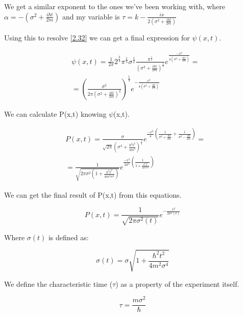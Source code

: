 We get a similar exponent to the ones we've been working with, where $\alpha = - (\sigma^2 + \frac{i\hbar t}{2m})$ and my variable is $\tau = k - \frac{ix}{2(\sigma^2+\frac{i\hbar t}{2m})}$

Using this to resolve \ref{2.32} we can get a final expression for $\psi(x,t)$.

\begin{equation}
    \label{2.34}
    \begin{split}
        &\psi(x,t) = \frac{1}{2\pi} 2^\frac{3}{4} \pi^\frac{1}{4} \sigma^\frac{1}{2} \frac{\pi^\frac{1}{2}}{(\sigma^2 + \frac{i\hbar t}{2m})^\frac{1}{2}} e^{\frac{-x^2}{4(\sigma^2 + \frac{i\hbar t}{2m})}} = \\
        & = \left( \frac{\sigma^2}{2\pi(\sigma^2 + \frac{i\hbar t}{2m})^2}\right)^{\frac{1}{4}}e^{-\frac{x^2}{4(\sigma^2 + \frac{i\hbar t}{2m})}}
    \end{split}
\end{equation}

We can calculate P(x,t) knowing $\psi$(x,t).

\begin{equation}
    \label{2.35}
    \begin{split}
        & P(x,t) = \frac{\sigma}{\sqrt{2\pi}(\sigma^4 + \frac{\hbar^2t^2}{4m^2})^\frac{1}{2}}e^{\frac{-x^2}{4}\left(  \frac{1}{\sigma^2 + \frac{ikt}{2m}} + \frac{1}{\sigma^2 - \frac{ikt}{2m}}   \right)} = \\
        & = \frac{1}{\sqrt{2\pi\sigma^2(1+\frac{\hbar^2t^2}{4m^2\sigma^4})}} e^{\frac{-x^2}{2\sigma^2}\left(
     \frac{1}{1+\frac{k^2t^2}{4m^2\sigma^4}}\right)}
    \end{split}
\end{equation}


We can get the final result of P(x,t) from this equations.

\begin{equation}
    \label{2.36}
    P(x,t) = \frac{1}{\sqrt{2\pi \sigma^2(t)}} e^{-\frac{x^2}{2\sigma^2(t)}}
\end{equation}

Where $\sigma(t)$ is defined as:

\begin{equation}
    \label{2.37}
    \sigma(t) = \sigma\sqrt{1+\frac{\hbar^2t^2}{4m^2\sigma^4}}
\end{equation}

We define the characteristic time ($\tau$) as a property of the experiment itself.

\begin{equation}
    \label{2.38}
    \tau = \frac{m\sigma^2}{\hbar}
\end{equation}

